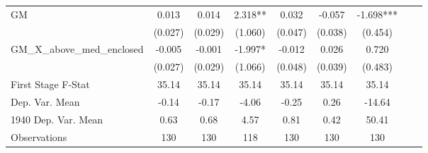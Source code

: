 \begin{tabular}{l*{8}{c}}
\cmidrule(lr){1-7}
GM              &    0.013   &    0.014   &    2.318** &    0.032   &   -0.057   &   -1.698***\\
                &  (0.027)   &  (0.029)   &  (1.060)   &  (0.047)   &  (0.038)   &  (0.454)   \\
\addlinespace
GM\_X\_above\_med\_enclosed&   -0.005   &   -0.001   &   -1.997*  &   -0.012   &    0.026   &    0.720   \\
                &  (0.027)   &  (0.029)   &  (1.066)   &  (0.048)   &  (0.039)   &  (0.483)   \\
\midrule
First Stage F-Stat&    35.14   &    35.14   &    35.14   &    35.14   &    35.14   &    35.14   \\
Dep. Var. Mean  &    -0.14   &    -0.17   &    -4.06   &    -0.25   &     0.26   &   -14.64   \\
1940 Dep. Var. Mean&     0.63   &     0.68   &     4.57   &     0.81   &     0.42   &    50.41   \\
Observations    &      130   &      130   &      118   &      130   &      130   &      130   \\
 \bottomrule \end{tabular}
